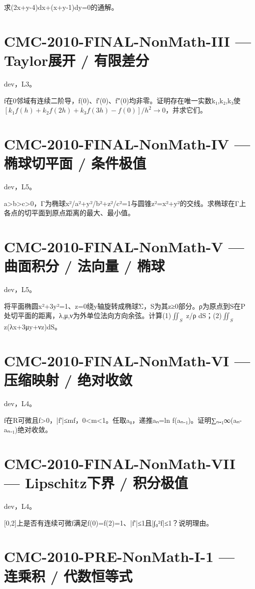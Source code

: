 \documentclass[UTF8]{ctexart}
\begin{document}
求(2x+y-4)dx+(x+y-1)dy=0的通解。

\section*{CMC-2010-FINAL-NonMath-III — Taylor展开 / 有限差分}

dev，L3。

f在0邻域有连续二阶导，f(0)、f′(0)、f″(0)均非零。证明存在唯一实数k₁,k₂,k₃使 $[k_1f(h)+k_2f(2h)+k_3f(3h)-f(0)]/h^2\to0$，并求它们。

\section*{CMC-2010-FINAL-NonMath-IV — 椭球切平面 / 条件极值}

dev，L5。

a>b>c>0，Γ为椭球x²/a²+y²/b²+z²/c²=1与圆锥z²=x²+y²的交线。求椭球在Γ上各点的切平面到原点距离的最大、最小值。

\section*{CMC-2010-FINAL-NonMath-V — 曲面积分 / 法向量 / 椭球}

dev，L5。

将平面椭圆x²+3y²=1、z=0绕y轴旋转成椭球Σ，S为其z≥0部分。ρ为原点到S在P处切平面的距离，λ,μ,ν为外单位法向方向余弦。计算(1)$∬_S$ z/ρ dS；(2)$∬_S$ z(λx+3μy+νz)dS。

\section*{CMC-2010-FINAL-NonMath-VI — 压缩映射 / 绝对收敛}

dev，L4。

f在R可微且f>0，|f′|≤mf，0<m<1。任取a₀，递推aₙ=ln f(aₙ₋₁)。证明∑ₙ₌₁∞(aₙ-aₙ₋₁)绝对收敛。

\section*{CMC-2010-FINAL-NonMath-VII — Lipschitz下界 / 积分极值}

dev，L4。

[0,2]上是否有连续可微f满足f(0)=f(2)=1、|f′|≤1且|∫₀²f|≤1？说明理由。

\section*{CMC-2010-PRE-NonMath-I-1 — 连乘积 / 代数恒等式}
\end{document}
